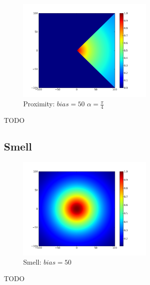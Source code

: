 \documentclass[a4paper]{article}
\begin{document}
\begin{figure}[h]
	\vspace{-20pt}
	\begin{center}
		\includegraphics[width=0.6\textwidth]{graphs/sensors/proximity.png}
	\end{center}
	\vspace{-20pt}
	\caption{Proximity: $bias=50$ $\alpha=\frac{\pi}{4}$}
\end{figure}

TODO

\cleardoublepage
\subsection{Smell}
\begin{figure}[h]
	\vspace{-20pt}
	\begin{center}
		\includegraphics[width=0.6\textwidth]{graphs/sensors/smell.png}
	\end{center}
	\vspace{-20pt}
	\caption{Smell: $bias=50$}
\end{figure}

TODO

\cleardoublepage
\end{document}
